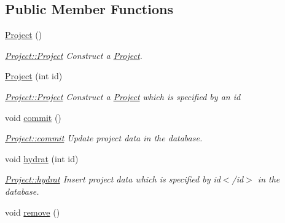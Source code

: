 \subsection*{Public Member Functions}
\begin{DoxyCompactItemize}
\item 
\hypertarget{classProject_aa007ecd17d5bc800e7a956cf666eea21}{\hyperlink{classProject_aa007ecd17d5bc800e7a956cf666eea21}{Project} ()}\label{classProject_aa007ecd17d5bc800e7a956cf666eea21}

\begin{DoxyCompactList}\small\item\em \hyperlink{classProject_aa007ecd17d5bc800e7a956cf666eea21}{Project\-::\-Project} Construct a \hyperlink{classProject}{Project}. \end{DoxyCompactList}\item 
\hyperlink{classProject_a8f608fdf1f0687598294f9534d702dd5}{Project} (int id)
\begin{DoxyCompactList}\small\item\em \hyperlink{classProject_aa007ecd17d5bc800e7a956cf666eea21}{Project\-::\-Project} Construct a \hyperlink{classProject}{Project} which is specified by an {\itshape id} \end{DoxyCompactList}\item 
\hypertarget{classProject_ab471d9354fb128c801f455e9a6bef675}{void \hyperlink{classProject_ab471d9354fb128c801f455e9a6bef675}{commit} ()}\label{classProject_ab471d9354fb128c801f455e9a6bef675}

\begin{DoxyCompactList}\small\item\em \hyperlink{classProject_ab471d9354fb128c801f455e9a6bef675}{Project\-::commit} Update project data in the database. \end{DoxyCompactList}\item 
void \hyperlink{classProject_aa966f15c9c8a277844a75c3530701525}{hydrat} (int id)
\begin{DoxyCompactList}\small\item\em \hyperlink{classProject_aa966f15c9c8a277844a75c3530701525}{Project\-::hydrat} Insert project data which is specified by {\itshape id$<$/id$>$ in the database. }\end{DoxyCompactList}\item 
\hypertarget{classProject_a7bd735a59c2fdf2718db14c3073245fc}{void \hyperlink{classProject_a7bd735a59c2fdf2718db14c3073245fc}{remove} ()}\label{classProject_a7bd735a59c2fdf2718db14c3073245fc}


\end{DoxyCompactItemize}
